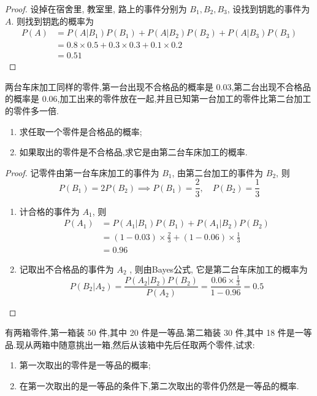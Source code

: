 \documentclass[../main.tex]{subfiles}
\begin{document}
\begin{proof}
    设掉在宿舍里, 教室里, 路上的事件分别为 \(  B_1,B_2,B_3  \), 设找到钥匙的事件为 \(  A  \). 则找到钥匙的概率为 \[
   \begin{aligned}
    P\left( A \right)&= P\left( A|B_1 \right)P\left( B_1 \right)+ P\left( A|B_2 \right)P\left( B_2 \right)+ P\left( A|B_3 \right)P\left( B_3 \right) \\ 
     &= 0.8\times 0.5+ 0.3\times 0.3+ 0.1\times 0.2\\ 
      &= 0.51
   \end{aligned}       
    \] 
\end{proof}
\begin{exercise}{}{}
两台车床加工同样的零件,第一台出现不合格品的概率是 0.03,第二台出现不合格品的概率是 0.06,加工出来的零件放在一起,并且已知第一台加工的零件比第二台加工的零件多一倍.
\begin{enumerate}
    \item 求任取一个零件是合格品的概率;
    \item 如果取出的零件是不合格品,求它是由第二台车床加工的概率.
\end{enumerate}
\end{exercise}

\begin{proof}
    记零件由第一台车床加工的事件为 \(  B_1  \), 由第二台加工的事件为 \(  B_2  \), 则 \[
    P\left( B_1 \right)= 2P\left( B_2 \right)\implies P\left( B_1 \right)= \frac{2 }{3 },\quad P\left( B_2 \right)= \frac{1 }{3 }      
    \]  \begin{enumerate}
        \item 计合格的事件为 \(  A_1 \), 则 \[
        \begin{aligned}
        P\left( A_1 \right)&= P\left( A_1|B_1 \right)P\left( B_1 \right)+ P\left( A_1|B_2 \right)P\left( B_2 \right)      \\ 
         &= \left( 1-0.03 \right)\times \frac{2 }{3 }  + \left( 1-0.06 \right)\times \frac{1 }{3 }  \\ 
          &= 0.96
        \end{aligned}
        \] 
        \item 记取出不合格品的事件为 \(  A_2  \) , 则由Bayes公式, 它是第二台车床加工的概率为 \[
        P\left( B_2|A_2 \right)= \frac{P\left( A_2|B_2\right)P\left( B_2 \right)   }{ P\left( A_2 \right) }  = \frac{0.06\times \frac{1 }{3 }  }{1-0.96 }= 0.5 
        \]
    \end{enumerate}
    
\end{proof}
\begin{exercise}{}{}
有两箱零件,第一箱装 50 件,其中 20 件是一等品.第二箱装 30 件,其中 18 件是一等品.现从两箱中随意挑出一箱,然后从该箱中先后任取两个零件,试求:
\begin{enumerate}
    \item 第一次取出的零件是一等品的概率;
    \item 在第一次取出的是一等品的条件下,第二次取出的零件仍然是一等品的概率.
\end{enumerate}
\end{exercise}
\end{document}
